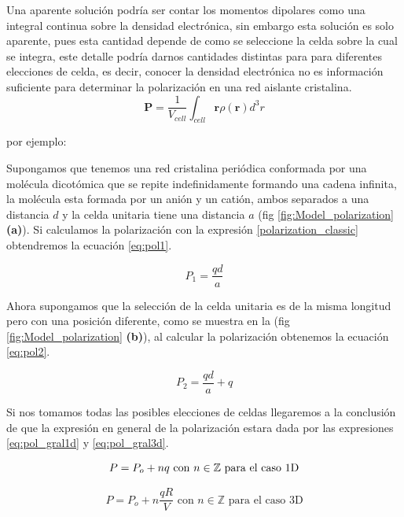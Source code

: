 

Una aparente solución podría ser contar los momentos dipolares como una integral continua sobre la densidad electrónica, sin embargo esta solución es solo aparente, pues esta cantidad depende de como se seleccione la celda sobre la cual se integra, este detalle podría darnos cantidades distintas para para diferentes elecciones de celda, es decir, conocer la densidad electrónica no es información suficiente para determinar la polarización en una red aislante cristalina.
\begin{equation}
\label{polarization_classic}
\textbf{P} = \frac{1}{V_{cell}}\int_{cell} \textbf{r} \rho(\textbf{r})d^3r
\end{equation}

por ejemplo:

Supongamos que tenemos una red cristalina periódica conformada por una molécula dicotómica que se repite indefinidamente formando una cadena infinita, la molécula esta formada por un anión y un catión, ambos separados a una distancia $d$ y la celda unitaria tiene una distancia $a$ (fig \ref{fig:Model_polarization} \textbf{(a)}). Si calculamos la polarización con la expresión \ref{polarization_classic} obtendremos la ecuación \ref{eq:pol1}.

\begin{equation}
    \label{eq:pol1}
    P_1 = \frac{qd}{a}
\end{equation}

Ahora supongamos que la selección de la celda unitaria es de la misma longitud pero con una posición diferente, como se muestra en la (fig \ref{fig:Model_polarization} \textbf{(b)}), al calcular la polarización obtenemos la ecuación \ref{eq:pol2}.

\begin{equation}
    \label{eq:pol2}
    P_2 = \frac{qd}{a} + q
\end{equation}

Si nos tomamos todas las posibles elecciones de celdas llegaremos a la conclusión de que la expresión en general de la polarización estara dada por las expresiones \ref{eq:pol_gral1d} y \ref{eq:pol_gral3d}.

\begin{equation}
    \label{eq:pol_gral1d}
    P = P_o + nq\,\,  {\rm con} \,\,n \in \mathbb{Z}\,\, \text{para el caso 1D} 
\end{equation}

\begin{equation}
    \label{eq:pol_gral3d}
    P = P_o + n\frac{qR}{V}\,\,  \text{con} \,\,n \in \mathbb{Z}\,\, \text{para el caso 3D}
\end{equation}

